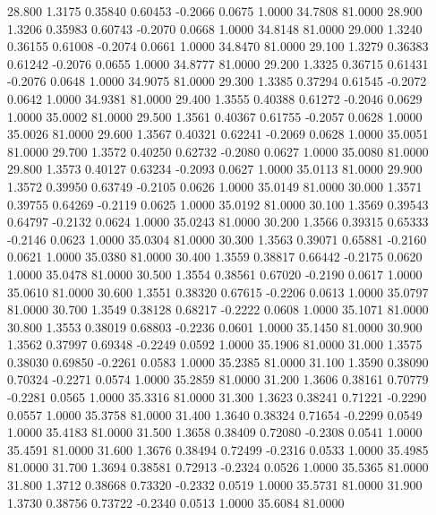   28.800   1.3175   0.35840   0.60453  -0.2066   0.0675   1.0000  34.7808  81.0000
  28.900   1.3206   0.35983   0.60743  -0.2070   0.0668   1.0000  34.8148  81.0000
  29.000   1.3240   0.36155   0.61008  -0.2074   0.0661   1.0000  34.8470  81.0000
  29.100   1.3279   0.36383   0.61242  -0.2076   0.0655   1.0000  34.8777  81.0000
  29.200   1.3325   0.36715   0.61431  -0.2076   0.0648   1.0000  34.9075  81.0000
  29.300   1.3385   0.37294   0.61545  -0.2072   0.0642   1.0000  34.9381  81.0000
  29.400   1.3555   0.40388   0.61272  -0.2046   0.0629   1.0000  35.0002  81.0000
  29.500   1.3561   0.40367   0.61755  -0.2057   0.0628   1.0000  35.0026  81.0000
  29.600   1.3567   0.40321   0.62241  -0.2069   0.0628   1.0000  35.0051  81.0000
  29.700   1.3572   0.40250   0.62732  -0.2080   0.0627   1.0000  35.0080  81.0000
  29.800   1.3573   0.40127   0.63234  -0.2093   0.0627   1.0000  35.0113  81.0000
  29.900   1.3572   0.39950   0.63749  -0.2105   0.0626   1.0000  35.0149  81.0000
  30.000   1.3571   0.39755   0.64269  -0.2119   0.0625   1.0000  35.0192  81.0000
  30.100   1.3569   0.39543   0.64797  -0.2132   0.0624   1.0000  35.0243  81.0000
  30.200   1.3566   0.39315   0.65333  -0.2146   0.0623   1.0000  35.0304  81.0000
  30.300   1.3563   0.39071   0.65881  -0.2160   0.0621   1.0000  35.0380  81.0000
  30.400   1.3559   0.38817   0.66442  -0.2175   0.0620   1.0000  35.0478  81.0000
  30.500   1.3554   0.38561   0.67020  -0.2190   0.0617   1.0000  35.0610  81.0000
  30.600   1.3551   0.38320   0.67615  -0.2206   0.0613   1.0000  35.0797  81.0000
  30.700   1.3549   0.38128   0.68217  -0.2222   0.0608   1.0000  35.1071  81.0000
  30.800   1.3553   0.38019   0.68803  -0.2236   0.0601   1.0000  35.1450  81.0000
  30.900   1.3562   0.37997   0.69348  -0.2249   0.0592   1.0000  35.1906  81.0000
  31.000   1.3575   0.38030   0.69850  -0.2261   0.0583   1.0000  35.2385  81.0000
  31.100   1.3590   0.38090   0.70324  -0.2271   0.0574   1.0000  35.2859  81.0000
  31.200   1.3606   0.38161   0.70779  -0.2281   0.0565   1.0000  35.3316  81.0000
  31.300   1.3623   0.38241   0.71221  -0.2290   0.0557   1.0000  35.3758  81.0000
  31.400   1.3640   0.38324   0.71654  -0.2299   0.0549   1.0000  35.4183  81.0000
  31.500   1.3658   0.38409   0.72080  -0.2308   0.0541   1.0000  35.4591  81.0000
  31.600   1.3676   0.38494   0.72499  -0.2316   0.0533   1.0000  35.4985  81.0000
  31.700   1.3694   0.38581   0.72913  -0.2324   0.0526   1.0000  35.5365  81.0000
  31.800   1.3712   0.38668   0.73320  -0.2332   0.0519   1.0000  35.5731  81.0000
  31.900   1.3730   0.38756   0.73722  -0.2340   0.0513   1.0000  35.6084  81.0000
